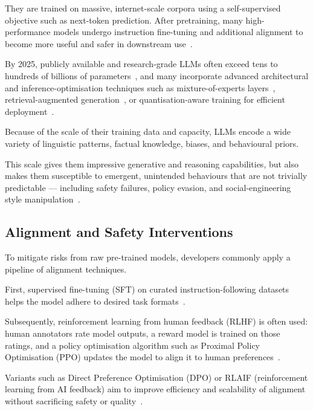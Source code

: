 They are trained on massive, internet-scale corpora using a self-supervised objective such as next-token prediction.
After pretraining, many high-performance models undergo instruction fine-tuning and additional alignment to become more useful and safer in downstream use~\cite{zhang2024scaling}.

By 2025, publicly available and research-grade LLMs often exceed tens to hundreds of billions of parameters~\cite{lu2024blending}, and many incorporate advanced architectural and inference-optimisation techniques such as mixture-of-experts layers~\cite{fedus2022switch}, retrieval-augmented generation~\cite{borgeaud2022improving}, or quantisation-aware training for efficient deployment~\cite{dettmers2023qlora}.

Because of the scale of their training data and capacity, LLMs encode a wide variety of linguistic patterns, factual knowledge, biases, and behavioural priors.

This scale gives them impressive generative and reasoning capabilities, but also makes them susceptible to emergent, unintended behaviours that are not trivially predictable — including safety failures, policy evasion, and social-engineering style manipulation~\cite{wei2023jailbroken}.

\subsection{Alignment and Safety Interventions}\label{subsec:alignment}

To mitigate risks from raw pre-trained models, developers commonly apply a pipeline of alignment techniques.

First, supervised fine-tuning (SFT) on curated instruction-following datasets helps the model adhere to desired task formats~\cite{zhang2024scaling, stiennon2022learning}.

Subsequently, reinforcement learning from human feedback (RLHF) is often used: human annotators rate model outputs, a reward model is trained on those ratings, and a policy optimisation algorithm such as Proximal Policy Optimisation (PPO) updates the model to align it to human preferences~\cite{ouyang2022training, schulman2017proximal}.

Variants such as Direct Preference Optimisation (DPO) or RLAIF (reinforcement learning from AI feedback) aim to improve efficiency and scalability of alignment without sacrificing safety or quality~\cite{rafailov2024direct, lee2024rlaif}.

